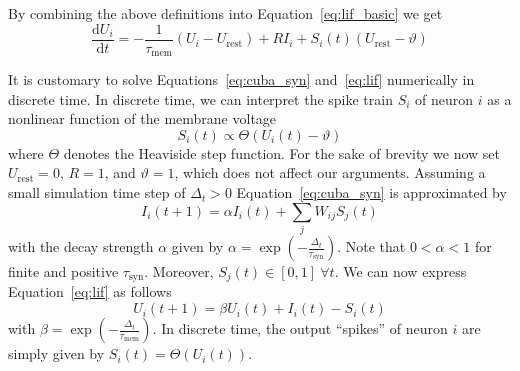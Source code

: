 \documentclass[journal,onecolumn,11pt]{IEEEtran}
\begin{document}
By combining the above definitions into Equation~\eqref{eq:lif_basic} we get 
\begin{equation} 
    \frac{\mathrm{d}U_i}{\mathrm{d}t} = -\frac{1}{\tau_\mathrm{mem}}(U_i-U_\mathrm{rest}) + RI_i + S_i(t)(U_\mathrm{rest}-\vartheta)
    \label{eq:lif}
\end{equation}

It is customary to solve Equations~\eqref{eq:cuba_syn} and~\eqref{eq:lif}
numerically in discrete time.  In discrete time, we can interpret the spike
train $S_i$ of neuron $i$ as a nonlinear function of the membrane voltage
\begin{equation}
    S_i(t)\propto\Theta(U_i(t)-\vartheta)
    \label{eq:spike}
\end{equation}
where $\Theta$ denotes the Heaviside step function.  For the sake of brevity we
now set $U_\mathrm{rest}=0$, $R=1$, and $\vartheta=1$, which does not affect our
arguments.  Assuming a small simulation time step of $\Delta_t>0$
Equation~\eqref{eq:cuba_syn} is approximated by
\begin{equation}
  I_i(t+1) = \alpha I_i(t) + \sum_j W_{ij} S_j(t)
    \label{eq:syn_discrete_time}
\end{equation}
with the decay strength $\alpha$ given by
$\alpha=\exp\left(-\frac{\Delta_t}{\tau_\mathrm{syn}} \right)$.  Note that
$0<\alpha<1$ for finite and positive $\tau_\mathrm{syn}$.  Moreover, $S_j(t) \in
[0,1]~ \forall t$.  We can now express Equation~\eqref{eq:lif} as follows 
\begin{equation}
    U_i(t+1) = \beta U_i(t) + I_i(t) -S_i(t)
    \label{eq:mem_discrete_time}
\end{equation}
with $\beta=\exp\left(-\frac{\Delta_t}{\tau_\mathrm{mem}}\right)$.
In discrete time, the output ``spikes'' of neuron $i$ are simply given by $S_i(t)=\Theta(U_i(t))$.
\end{document}

